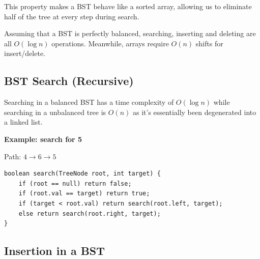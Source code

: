 This property makes a BST behave like a sorted array, allowing us to eliminate half of the tree at every step during search. 

Assuming that a BST is perfectly balanced, searching, inserting and deleting are all $O(\log n)$ operations. Meanwhile, arrays require $O(n)$ shifts for insert/delete.

\begin{center}
\end{center}

\subsection{BST Search (Recursive)}

Searching in a balanced BST has a time complexity of \textbf{$O(\log n)$} while searching in a unbalanced tree is $O(n)$ as it's essentially been degenerated into a linked list.

\textbf{Example: search for 5}

\begin{center}
\end{center}

Path: $4 \rightarrow 6 \rightarrow 5$

\begin{verbatim}
boolean search(TreeNode root, int target) {
    if (root == null) return false;
    if (root.val == target) return true;
    if (target < root.val) return search(root.left, target);
    else return search(root.right, target);
}
\end{verbatim}

\subsection{Insertion in a BST}

